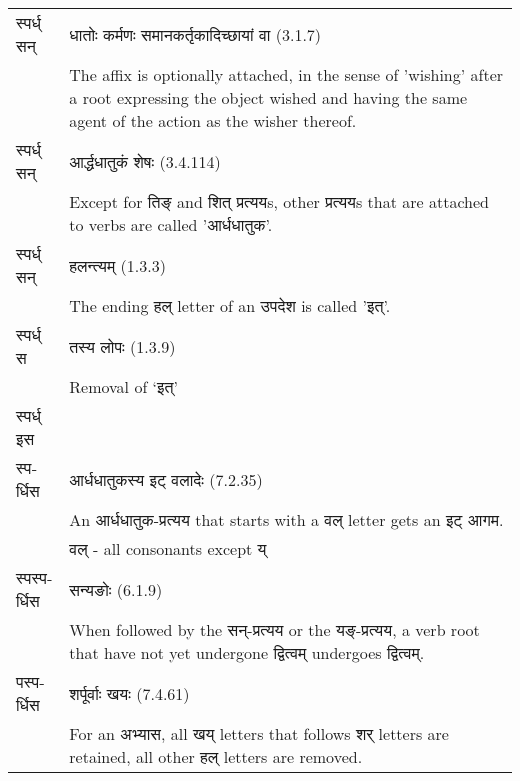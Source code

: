 		\begin{longtable}{ |p{1.4cm}|p{14.6cm}| } 
			\hline
			\rowcolor{blue!10}
			\texthindi{स्पर्ध् सन्}
			&\texthindi{धातोः कर्मणः समानकर्तृकादिच्छायां वा} (3.1.7)\\
			\rowcolor{blue!10}
			&The affix is optionally attached, in the sense of 'wishing' after a root expressing the object wished and having the same agent of the action as the wisher thereof. 
			\\\hline
			\rowcolor{blue!10}
			\texthindi{स्पर्ध् सन्}
			&\texthindi{आर्द्धधातुकं शेषः}  (3.4.114)\\
			\rowcolor{blue!10}
			&Except for \texthindi{तिङ्} and \texthindi{शित् प्रत्यय}s, other \texthindi{प्रत्यय}s that are attached to verbs are called '\texthindi{आर्धधातुक}'. 
			\\\hline
			\rowcolor{red!10}
			\texthindi{स्पर्ध् सन्}
			&\texthindi{हलन्त्यम्} (1.3.3) \\
			\rowcolor{red!10}
			&The ending \texthindi{हल्} letter of an \texthindi{उपदेश} is called '\texthindi{इत्}'. 
			\\\hline
			\rowcolor{red!10}
			\texthindi{स्पर्ध् स}
			&\texthindi{तस्य लोपः} (1.3.9)\\
			\rowcolor{red!10}
			&Removal of ‘\texthindi{इत्}’ 
			\\\hline
			\rowcolor{yellow!10}
			\texthindi{स्पर्ध् इस}&\\
			\rowcolor{yellow!10}
			\texthindi{स्पर्धिस}
			&\texthindi{आर्धधातुकस्य इट् वलादेः} (7.2.35)\\
			\rowcolor{yellow!10}
			&An \texthindi{आर्धधातुक-प्रत्यय} that starts with a \texthindi{वल्} letter gets an \texthindi{इट् आगम}.\\ 
			\rowcolor{yellow!10}
			&\texthindi{वल्} - all consonants except \texthindi{य्}
			\\\hline
			\rowcolor{green!10}
			\texthindi{स्पस्पर्धिस}
			&\texthindi{सन्यङोः} (6.1.9)\\
			\rowcolor{green!10}
			&When followed by the \texthindi{सन्-प्रत्यय} or the \texthindi{यङ्-प्रत्यय}, a verb root that have not yet undergone \texthindi{द्वित्वम्} undergoes \texthindi{द्वित्वम्}.
			\\\hline
			\rowcolor{green!10}
			\texthindi{पस्पर्धिस}
			&\texthindi{शर्पूर्वाः खयः} (7.4.61)\\
			\rowcolor{green!10}
			&For an \texthindi{अभ्यास}, all \texthindi{खय्} letters that follows \texthindi{शर्} letters are retained, all other \texthindi{हल्} letters are removed. 

\end{longtable}
